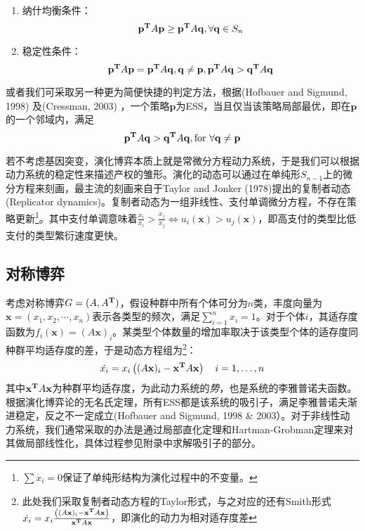\documentclass[lang=cn,12pt,a4paper]{elegantpaper}
\begin{document}
\begin{enumerate}
\item 纳什均衡条件：
\begin{equation}
\mathbf{p}^{\bf{T}}A\mathbf{p}\ge \mathbf{p}^{\bf{T}}A\mathbf{q}, \forall\mathbf{q}\in S_n
\end{equation}
\item 稳定性条件：
\begin{equation}
    \mathbf{p}^{\bf{T}}A\mathbf{p}=\mathbf{p}^{\bf{T}}A\mathbf{q},\mathbf{q}\ne \mathbf{p},\\
\mathbf{p}^{\bf{T}}A\mathbf{q} > \mathbf{q}^{\bf{T}}A\mathbf{q}
\end{equation}
\end{enumerate}
或者我们可采取另一种更为简便快捷的判定方法，根据(Hofbauer and Sigmund, 1998) 及(Cressman, 2003) ，一个策略$\mathbf{p}$为ESS，当且仅当该策略局部最优，即在$\mathbf{p}$的一个邻域内，满足
\begin{equation}
\mathbf{p}^{\bf{T}}A\mathbf{q}>\mathbf{q}^{\bf{T}}A\mathbf{q}, \text{for }\forall \mathbf{q}\ne\mathbf{p}
\end{equation}

若不考虑基因突变，演化博弈本质上就是常微分方程动力系统，于是我们可以根据动力系统的稳定性来描述产权的雏形。演化的动态可以通过在单纯形$S_{n-1}$上的微分方程来刻画，最主流的刻画来自于Taylor and Jonker (1978)提出的复制者动态(Replicator dynamics)。复制者动态为一组非线性、支付单调微分方程，不存在策略更新\footnote{$\sum {\dot {x_i}=0}$保证了单纯形结构为演化过程中的不变量。}。其中支付单调意味着$\frac{\dot{x}_{i}}{x_{i}}>\frac{\dot{x}_{j}}{x_{j}} \Longleftrightarrow u_{i}(\mathbf{x})>u_{j}(\mathbf{x})$，即高支付的类型比低支付的类型繁衍速度更快。




\subsection{对称博弈}

考虑对称博弈$G=(A,A^{\bf{T}})$，假设种群中所有个体可分为$n$类，丰度向量为$\mathbf{x}=(x_1,x_2,\cdots,x_n)$表示各类型的频次，满足$ \sum_{i=1}^nx_i=1$。对于个体$i$，其适存度函数为$f_{i}(\mathbf{x})=(A \mathbf{x})_{i}$。某类型个体数量的增加率取决于该类型个体的适存度同种群平均适存度的差，于是动态方程组为\footnote{此处我们采取复制者动态方程的Taylor形式，与之对应的还有Smith形式$\dot{{x}_{i}}=x_{i}\frac{\left((A \mathbf{x})_{i}-\mathbf{x}^{\bf{T}}  A \mathbf{x}\right)}{\mathbf{x}^{\bf{T}}  A \mathbf{x}}$，即演化的动力为相对适存度差}：
\begin{equation}
\dot{{x}_{i}}=x_{i}\left((A \mathbf{x})_{i}-\mathbf{x}^{\bf{T}}  A \mathbf{x}\right) \quad i=1, \ldots, n
\end{equation}
其中$\mathbf{x}^{\bf{T}}  A \mathbf{x} $为种群平均适存度，为此动力系统的\textit{势}，也是系统的李雅普诺夫函数。根据演化博弈论的无名氏定理，所有ESS都是该系统的吸引子，满足李雅普诺夫渐进稳定，反之不一定成立(Hofbauer and Sigmund, 1998 & 2003）。对于非线性动力系统，我们通常采取的办法是通过局部直化定理和Hartman-Grobman定理来对其做局部线性化，具体过程参见附录中求解吸引子的部分。
\end{document}
